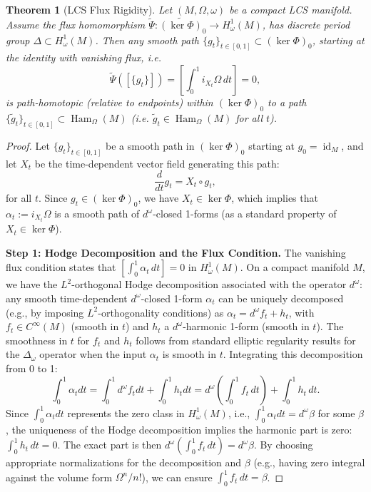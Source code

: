 \documentclass[11pt,a4paper]{amsart}
\newtheorem{theorem}{Theorem}[section]
\theoremstyle{definition}
\theoremstyle{remark}
\newcommand{\Ham}{\operatorname{Ham}}
\newcommand{\id}{\operatorname{id}}
\begin{document}
	\begin{theorem}[LCS Flux Rigidity] \label{thm:flux_rigidity}
		Let $(M, \Omega, \omega)$ be a compact LCS manifold. Assume the flux homomorphism $\widetilde{\Psi} : \widetilde{(\ker \Phi)}_0 \to H_\omega^1(M)$, has discrete period group $\Delta \subset H_\omega^1(M)$. Then any smooth path $\{g_t\}_{t \in [0,1]} \subset (\ker \Phi)_0$, starting at the identity with vanishing flux, i.e.
		\[
		\widetilde{\Psi}([\{g_t\}]) = \left[ \int_0^1 i_{X_t}\Omega \, dt \right] = 0,
		\]
		is path-homotopic (relative to endpoints) within $(\ker \Phi)_0$ to a path $\{\tilde{g}_t\}_{t \in [0,1]} \subset \Ham_\Omega(M)$ (i.e. $\tilde{g}_t \in \Ham_\Omega(M)$ for all $t$).
	\end{theorem}
	
	\begin{proof}
		Let $\{g_t\}_{t \in [0,1]}$ be a smooth path in $(\ker \Phi)_0$ starting at $g_0 = \id_M$, and let $X_t$ be the time-dependent vector field generating this path:
		\[
		\frac{d}{dt} g_t = X_t \circ g_t,
		\]
		for all $t$. Since $g_t \in (\ker \Phi)_0$, we have $X_t \in \ker \Phi$, which implies that $\alpha_t := i_{X_t}\Omega$ is a smooth path of $d^\omega$-closed 1-forms (as a standard property of $X_t \in \ker \Phi$).
		
		\textbf{Step 1: Hodge Decomposition and the Flux Condition.} The vanishing flux condition states that $\left[\int_0^1 \alpha_t \, dt\right] = 0$ in $H_\omega^1(M)$. On a compact manifold $M$, we have the $L^2$-orthogonal Hodge decomposition associated with the operator $d^\omega$: any smooth time-dependent $d^\omega$-closed 1-form $\alpha_t$ can be uniquely decomposed (e.g., by imposing $L^2$-orthogonality conditions) as $\alpha_t = d^\omega f_t + h_t$, with $f_t \in C^\infty(M)$ (smooth in $t$) and $h_t$ a $d^\omega$-harmonic 1-form (smooth in $t$). The smoothness in $t$ for $f_t$ and $h_t$ follows from standard elliptic regularity results for the $\Delta_\omega$ operator when the input $\alpha_t$ is smooth in $t$. Integrating this decomposition from 0 to 1:
		\[
		\int_0^1 \alpha_t dt = \int_0^1 d^\omega f_t dt + \int_0^1 h_t dt = d^\omega \left( \int_0^1 f_t \, dt \right) + \int_0^1 h_t \, dt.
		\]
		Since $\int_0^1 \alpha_t dt$ represents the zero class in $H_\omega^1(M)$, i.e., $\int_0^1 \alpha_t dt = d^\omega \beta$ for some $\beta$, the uniqueness of the Hodge decomposition implies the harmonic part is zero: $\int_0^1 h_t \, dt = 0$. The exact part is then $d^\omega(\int_0^1 f_t \, dt) = d^\omega \beta$. By choosing appropriate normalizations for the decomposition and $\beta$ (e.g., having zero integral against the volume form $\Omega^n/n!$), we can ensure $\int_0^1 f_t \, dt = \beta$.
		

\end{proof}
\end{document}
